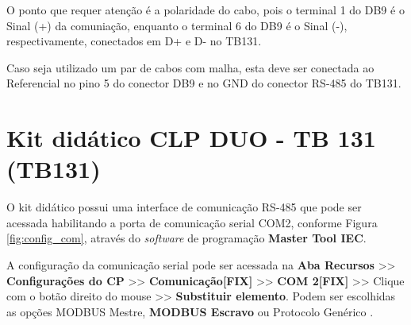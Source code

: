 \begin{figure}[ht!]
	\centering
\end{figure}

O ponto que requer atenção é a polaridade do cabo, pois o terminal 1 do DB9 é o Sinal (+) da comuniação, enquanto o terminal 6 do DB9 é o Sinal (-), respectivamente, conectados em D+ e D- no TB131. 

Caso seja utilizado um par de cabos com malha, esta deve ser conectada ao Referencial no pino 5 do conector DB9 e no GND do conector RS-485 do TB131. 









\section{Kit didático CLP DUO - \acrlong{TB} 131 (\acrshort{TB}131)}


O kit didático possui uma interface de comunicação RS-485 que pode ser acessada habilitando a porta de comunicação serial COM2, conforme Figura \ref{fig:config_com}, através do \textit{software} de programação \textbf{Master Tool IEC}. 

A configuração da comunicação serial pode ser acessada na \textbf{Aba Recursos} >> \textbf{Configurações do CP} >> \textbf{Comunicação[FIX]} >> \textbf{COM 2[FIX]} >> Clique com o botão direito do mouse >> \textbf{Substituir elemento}.
Podem ser escolhidas as opções MODBUS Mestre, \textbf{MODBUS Escravo} ou Protocolo Genérico \cite{tb131}. 


